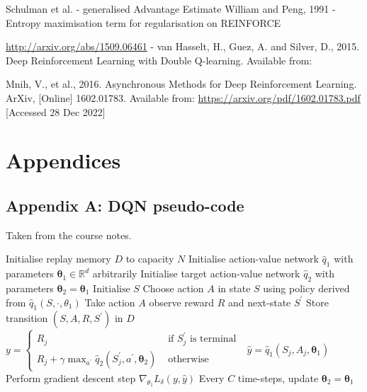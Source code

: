 \documentclass{article}
\begin{document}
Schulman et al. - generalised Advantage Estimate
William and Peng, 1991 - Entropy maximisation term for regularisation on REINFORCE

\url{http://arxiv.org/abs/1509.06461} - van Hasselt, H., Guez, A. and Silver, D., 2015. Deep Reinforcement Learning with Double Q-learning. Available from: 


\small

Mnih, V., et al., 2016. Asynchronous Methods for Deep Reinforcement Learning. ArXiv, [Online] 1602.01783.
Available from: \url{https://arxiv.org/pdf/1602.01783.pdf} [Accessed 28 Dec 2022]

\normalsize
\newpage
\section*{Appendices}
\subsection*{Appendix A: DQN pseudo-code}
\label{dqn_pseudo}
Taken from the course notes.
\begin{algorithmic}[1]
\State Initialise replay memory $D$ to capacity $N$
\State Initialise action-value network $\hat{q}_{1}$ with parameters $\boldsymbol{\theta}_{1} \in \mathbb{R}^{d}$ arbitrarily
\State Initialise target action-value network $\hat{q}_{2}$ with parameters $\boldsymbol{\theta}_{2}=\boldsymbol{\theta}_{1}$
    \State $\text{Initialise } S$
        \State Choose action $A$ in state $S$ using policy derived from  $\hat{q}_{1}\left(S, \cdot, \theta_{1}\right)$
        \State Take action $A$ observe reward $R$ and next-state $S^{\prime}$
        \State Store transition $\left(S, A, R, S^{\prime}\right)$ in $D$
            \State $y= \begin{cases}R_{j} & \text { if } S_{j}^{\prime} \text { is terminal } \\ R_{j}+\gamma \max _{a^{\prime}} \hat{q}_{2}\left(S_{j}^{\prime}, a^{\prime}, \boldsymbol{\theta}_{2}\right) & \text { otherwise }\end{cases}$
            \State $\hat{y}=\hat{q}_{1}\left(S_{j}, A_{j}, \boldsymbol{\theta}_{1}\right)$
            \State Perform gradient descent step $\nabla_{\theta_{1}} L_{\delta}(y, \hat{y})$
        \EndFor
    \State Every $C$ time-steps, update $\boldsymbol{\theta}_{2}=\boldsymbol{\theta}_{1}$
    \EndFor
\EndFor
\end{algorithmic}
\end{document}
